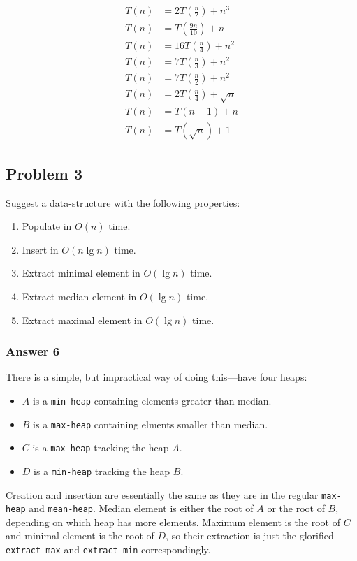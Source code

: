\documentclass[11pt]{article}
\begin{document}
\begin{align*}
  T(n) &= 2T(\frac{n}{2}) + n^3 \\
  T(n) &= T(\frac{9n}{10}) + n \\
  T(n) &= 16T(\frac{n}{4}) + n^2 \\
  T(n) &= 7T(\frac{n}{3}) + n^2 \\
  T(n) &= 7T(\frac{n}{2}) + n^2 \\
  T(n) &= 2T(\frac{n}{4}) + \sqrt{n} \\
  T(n) &= T(n - 1) + n \\
  T(n) &= T(\sqrt{n}) + 1
\end{align*}

\subsection{Problem 3}
\label{sec:orgheadline4}
Suggest a data-structure with the following properties:
\begin{enumerate}
\item Populate in \(O(n)\) time.
\item Insert in \(O(n \lg n)\) time.
\item Extract minimal element in \(O(\lg n)\) time.
\item Extract median element in \(O(\lg n)\) time.
\item Extract maximal element in \(O(\lg n)\) time.
\end{enumerate}

\subsubsection{Answer 6}
\label{sec:orgheadline3}
There is a simple, but impractical way of doing this---have four heaps:
\begin{itemize}
\item \(A\) is a \texttt{min-heap} containing elements greater than median.
\item \(B\) is a \texttt{max-heap} containing elments smaller than median.
\item \(C\) is a \texttt{max-heap} tracking the heap \(A\).
\item \(D\) is a \texttt{min-heap} tracking the heap \(B\).
\end{itemize}

Creation and insertion are essentially the same as they are in the regular
\texttt{max-heap} and \texttt{mean-heap}.  Median element is either the root of \(A\) or the
root of \(B\), depending on which heap has more elements.  Maximum element is
the root of \(C\) and minimal element is the root of \(D\), so their extraction
is just the glorified \texttt{extract-max} and \texttt{extract-min} correspondingly.
\end{document}
